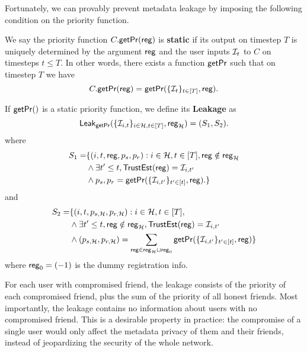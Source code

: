 Fortunately, we can provably prevent metadata leakage by imposing the following condition on the priority function.

\begin{definition}
\label{defn:messaging-static-priority}
We say the priority function $C.\mathsf{getPr}(\mathsf{reg})$ is \textbf{static} if its output on timestep $T$ is uniquely determined by the argument $\mathsf{reg}$ and the user inputs $\mathcal{I}_t$ to $C$ on timesteps $t \leq T$. In other words, there exists a function $\mathsf{getPr}$ such that on timestep $T$ we have
$$C.\mathsf{getPr}(\mathsf{reg}) = \mathsf{getPr}(\{\mathcal{I}_{t}\}_{t \in [T]}, \mathsf{reg}).$$

If $\mathsf{getPr}()$ is a static priority function, we define its \textbf{Leakage} as
$$\mathsf{Leak}_{\mathsf{getPr}}(\{\mathcal{I}_{i, t}\}_{i \in \mathcal{H}, t \in [T]}, \mathsf{reg}_{\mathcal{H}}) = (S_1, S_2).$$
where
\begin{align*} 
S_1 =& \{(i, t, \mathsf{reg}, p_{s}, p_{r}): i \in \mathcal{H}, t \in [T], \mathsf{reg} \notin \mathsf{reg}_{\mathcal{H}}  \\
 &\land \exists t' \leq t, \mathsf{TrustEst}(\mathsf{reg}) = \mathcal{I}_{i, t'}  \\
  &\land p_{s}, p_{r} = \mathsf{getPr}(\{\mathcal{I}_{i, t'}\}_{t' \in [t]}, \mathsf{reg}).\}
\end{align*}
and
\begin{align*} 
S_2 =& \{(i, t, p_{s, \mathcal{H}}, p_{r, \mathcal{H}}): i \in \mathcal{H}, t \in [T],  \\
 &\land \exists t' \leq t, \mathsf{reg} \notin \mathsf{reg}_{\mathcal{H}}, \mathsf{TrustEst}(\mathsf{reg}) = \mathcal{I}_{i, t'}  \\
  &\land (p_{s, \mathcal{H}}, p_{r, \mathcal{H}}) = \sum_{\mathsf{reg} \in \mathsf{reg}_{\mathcal{H}} \sqcup \mathsf{reg}_0} \mathsf{getPr}(\{\mathcal{I}_{i, t'}\}_{t' \in [t]}, \mathsf{reg})\}
\end{align*}
where $\mathsf{reg}_0 = (-1)$ is the dummy registration info.
\end{definition}
For each user with compromised friend, the leakage consists of the priority of each compromised friend, plus the sum of the priority of all honest friends. Most importantly, the leakage contains no information about users with no compromised friend. This is a desirable property in practice: the compromise of a single user would only affect the metadata privacy of them and their friends, instead of jeopardizing the security of the whole network.

